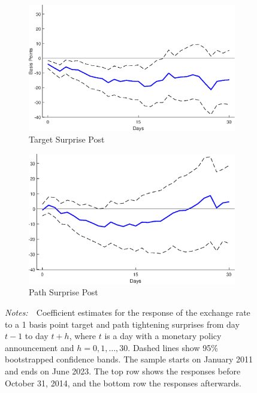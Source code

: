 \documentclass[a4paper, 12pt]{article}
\newcommand{\figtext}[1]{
	\vspace{-1ex}
	\captionsetup{justification=justified,font=footnotesize}
	\caption*{#1}
}
\newcommand{\fignotes}[1]{\figtext{\emph{Notes:~}~#1}}
\providecommand{\lastobsflwbdm}{June 2023}
\providecommand{\breakdatefx}{October 31, 2014}
\providecommand{\idxh}{h}
\begin{document}
{\begin{figure}[tbph]
\begin{center}
\begin{minipage}{\linewidth}
\begin{center}
\begin{subfigure}[b]{0.475\textwidth}
						\centering 
						\includegraphics[width=\textwidth]{../Figures/Target11FXpost.eps}
						\caption[]{{\small Target Surprise Post}} \label{subfig:Target11FXpost}
					\end{subfigure}
					\hfill
					\begin{subfigure}[b]{0.475\textwidth}   
						\centering 
						\includegraphics[width=\textwidth]{../Figures/Path11FXpost.eps}
						\caption[]{{\small Path Surprise Post}} \label{subfig:Path11FXpost}
					\end{subfigure}
				\end{center}
				\fignotes{Coefficient estimates for the response of the exchange rate to a 1 basis point target and path tightening surprises from day \(t - 1\) to day \(t + \idxh\), where \(t\) is a day with a monetary policy announcement and \(\idxh = 0, 1, \ldots, 30\). Dashed lines show 95\% bootstrapped confidence bands. The sample starts on January 2011 and ends on \lastobsflwbdm. The top row shows the responses before \breakdatefx, and the bottom row the responses afterwards.}
			\end{minipage} 
		\end{center}
	\end{figure}
}
\end{document}
